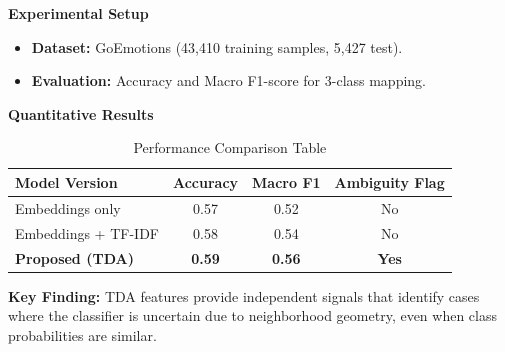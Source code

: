 \textbf{Experimental Setup}
\begin{itemize}
    \item \textbf{Dataset:} GoEmotions (43,410 training samples, 5,427 test).
    \item \textbf{Evaluation:} Accuracy and Macro F1-score for 3-class mapping.
\end{itemize}

\vspace{0.2cm}
\textbf{Quantitative Results}
\begin{table}
    \centering
    \small
    \begin{tabular}{lccc}
        \toprule
        \textbf{Model Version} & \textbf{Accuracy} & \textbf{Macro F1} & \textbf{Ambiguity Flag} \\
        \midrule
        Embeddings only        & 0.57 & 0.52 & No \\
        Embeddings + TF-IDF    & 0.58 & 0.54 & No \\
        \textbf{Proposed (TDA)} & \textbf{0.59} & \textbf{0.56} & \textbf{Yes} \\
        \bottomrule
    \end{tabular}
    \caption{Performance Comparison Table}
\end{table}

\vspace{0.1cm}
\textbf{Key Finding:}
TDA features provide independent signals that identify cases where the classifier is uncertain due to neighborhood geometry, even when class probabilities are similar.
